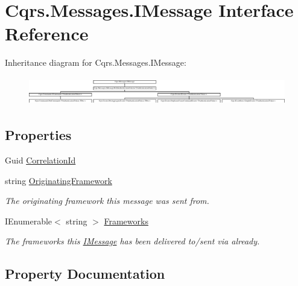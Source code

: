 \hypertarget{interfaceCqrs_1_1Messages_1_1IMessage}{}\section{Cqrs.\+Messages.\+I\+Message Interface Reference}
\label{interfaceCqrs_1_1Messages_1_1IMessage}
Inheritance diagram for Cqrs.\+Messages.\+I\+Message\+:\begin{figure}[H]
\begin{center}
\leavevmode
\includegraphics[height=1.250000cm]{interfaceCqrs_1_1Messages_1_1IMessage}
\end{center}
\end{figure}
\subsection*{Properties}
\begin{DoxyCompactItemize}
\item 
Guid \hyperlink{interfaceCqrs_1_1Messages_1_1IMessage_a9037d871a75ac76b190130aa56fe63a8}{Correlation\+Id}
\item 
string \hyperlink{interfaceCqrs_1_1Messages_1_1IMessage_aff9a2d35971384fb440954c3163eaeef}{Originating\+Framework}
\begin{DoxyCompactList}\small\item\em The originating framework this message was sent from. \end{DoxyCompactList}\item 
I\+Enumerable$<$ string $>$ \hyperlink{interfaceCqrs_1_1Messages_1_1IMessage_af147de5bb9a480ba75b5bb9f0ef12132}{Frameworks}
\begin{DoxyCompactList}\small\item\em The frameworks this \hyperlink{interfaceCqrs_1_1Messages_1_1IMessage}{I\+Message} has been delivered to/sent via already. \end{DoxyCompactList}\end{DoxyCompactItemize}


\subsection{Property Documentation}
\mbox{\label{interfaceCqrs_1_1Messages_1_1IMessage_a9037d871a75ac76b190130aa56fe63a8}} 
